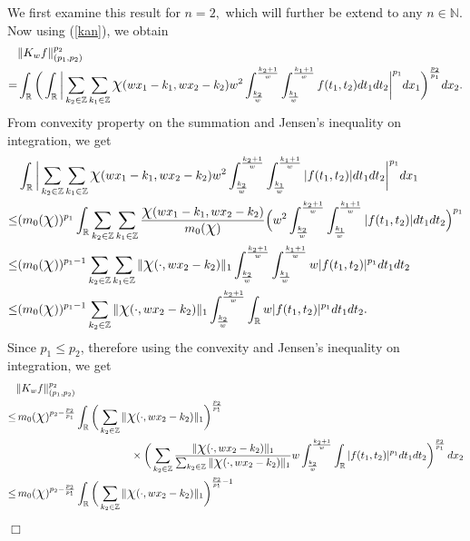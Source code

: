 \documentclass[11pt, a4paper]{article}
\theoremstyle{definition}
\newcommand{\qedwhite}{\hfill \ensuremath{\Box}}
\renewenvironment{proof}{{\raggedright \bfseries Proof.}}{\qedwhite}
\numberwithin{equation}{section}
\def\NN{\mathbb N}
\def\ZZ{\mathbb Z}
\def\RR{\mathbb R}
\def\Chi{\mbox{\Large$\chi$}}
\begin{document}
\begin{proof}
    We first examine this result for $n=2,$ which will further be extend to any $n \in \NN.$ Now using (\ref{kan}), we obtain
    \begin{align*} 
        &\|K_wf\|_{(p_1,p_2)}^{p_2}\\	
		=&\int_{\RR}\bigg(\int_{\RR} \bigg| \sum_{k_2 \in \ZZ}\sum_{k_1 \in \ZZ} \Chi(wx_1-k_1,wx_2-k_2) w^{2} \int_{\frac{k_2}{w}}^{\frac{k_2+1}{w}}\int_{\frac{k_1}{w}}^{\frac{k_1+1}{w}}f(t_1,t_2)dt_1dt_2\bigg|^{p_1}dx_1\bigg)^{\frac{p_2}{p_1}}dx_2.
    \end{align*}
    From convexity property on the summation and Jensen's inequality on integration, we get 
    \begin{align*}
        &\int_{\RR} \bigg|\sum_{k_2 \in \ZZ}\sum_{k_1 \in \ZZ}  \Chi(wx_1-k_1,wx_2-k_2) w^{2} \int_{\frac{k_2}{w}}^{\frac{k_2+1}{w}} \int_{\frac{k_1}{w}}^{\frac{k_1+1}{w}}|f(t_1,t_2)|dt_1dt_2\bigg|^{p_1}dx_1\\
        \leq &(m_{0}(\Chi))^{p_1}\int_{\RR} \sum_{k_2 \in \ZZ}\sum_{k_1 \in \ZZ} \frac{\Chi(wx_1-k_1,wx_2-k_2)}{m_{0}(\Chi)} \Big( w^{2} \int_{\frac{k_2}{w}}^{\frac{k_2+1}{w}} \int_{\frac{k_1}{w}}^{\frac{k_1+1}{w}}|f(t_1,t_2)|dt_1dt_2 \Big)^{p_1}\\
        \leq &(m_{0}(\Chi))^{p_1-1}\sum_{k_2 \in \ZZ}\sum_{k_1 \in \ZZ} \|\Chi(\cdot,wx_2-k_2)\|_1 \int_{\frac{k_2}{w}}^{\frac{k_2+1}{w}}\int_{\frac{k_1}{w}}^{\frac{k_1+1}{w}} w|f(t_1,t_2)|^{p_1}dt_1dt_2\\
        \leq &(m_{0}(\Chi))^{p_1-1}\sum_{k_2 \in \ZZ} \|\Chi(\cdot,wx_2-k_2)\|_1 \int_{\frac{k_2}{w}}^{\frac{k_2+1}{w}}\int_{\RR} w|f(t_1,t_2)|^{p_1}dt_1dt_2.
    \end{align*}
    Since $p_1\leq p_2$, therefore using the convexity and Jensen's inequality on integration, we get
    \begin{align*}
		&\|K_wf\|_{(p_1,p_2)}^{p_2}\\
		\leq&\, m_{0}(\Chi)^{p_2-\frac{p_2}{p_1}}\int_{\RR} \bigg(\sum_{k_2 \in \ZZ} \|\Chi(\cdot,wx_{2}-k_2)\|_1\bigg)^{\frac{p_2}{p_1}} \\
		&\hspace{1.5in}\times \bigg( \sum_{k_2 \in \ZZ}\frac{\|\Chi(\cdot,wx_{2}-k_2)\|_1}{\sum_{k_2 \in \ZZ} \|\Chi(\cdot,wx_{2}-k_2)\|_1} w \int_{\frac{k_2}{w}}^{\frac{k_2+1}{w}} \int_{\RR} |f(t_1,t_2)|^{p_1}dt_1 dt_2\bigg)^{\frac{p_2}{p_1}}\, dx_2\\
		\leq &\, m_{0}(\Chi)^{p_2-\frac{p_2}{p_1}}\int_{\RR} \bigg(\sum_{k_2 \in \ZZ} \|\Chi(\cdot,wx_{2}-k_2)\|_1\bigg)^{\frac{p_2}{p_1}-1} \\

\end{align*}
\end{proof}
\end{document}
